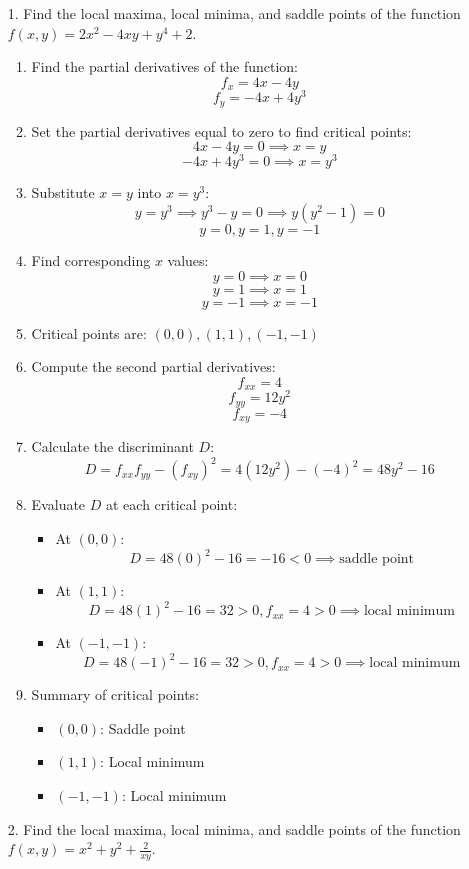 \documentclass[reqno, 12pt]{amsart}
\begin{document}
\newpage
\begin{itemize}
  \item[1.] Find the local maxima, local minima, and saddle points of the function $f(x,y) = 2x^2 -4xy +y^4 +2$.
    \newline

    \begin{answerbox}
      \begin{enumerate}
        \item Find the partial derivatives of the function:
          \[f_x = 4x - 4y\]
          \[f_y = -4x + 4y^3\]
        \item Set the partial derivatives equal to zero to find critical points:
          \[4x - 4y = 0 \implies x = y\]
          \[-4x + 4y^3 = 0 \implies x = y^3\]
        \item Substitute $x = y$ into $x = y^3$:
          \[y = y^3 \implies y^3 - y = 0 \implies y(y^2 - 1) = 0\]
          \[y = 0, y = 1, y = -1\]
        \item Find corresponding $x$ values:
          \[y = 0 \implies x = 0\]
          \[y = 1 \implies x = 1\]
          \[y = -1 \implies x = -1\]
        \item Critical points are: \((0,0), (1,1), (-1,-1)\)
        \item Compute the second partial derivatives:
          \[f_{xx} = 4\]
          \[f_{yy} = 12y^2\]
          \[f_{xy} = -4\]
        \item Calculate the discriminant \(D\):
          \[D = f_{xx}f_{yy} - (f_{xy})^2 = 4(12y^2) - (-4)^2 = 48y^2 - 16\]
        \item Evaluate \(D\) at each critical point:
          \begin{itemize}
            \item At \((0,0)\):
              \[D = 48(0)^2 - 16 = -16 < 0 \implies \text{saddle point}\]
            \item At \((1,1)\):
              \[D = 48(1)^2 - 16 = 32 > 0, f_{xx} = 4 > 0 \implies \text{local minimum}\]
            \item At \((-1,-1)\):
              \[D = 48(-1)^2 - 16 = 32 > 0, f_{xx} = 4 > 0 \implies \text{local minimum}\]
          \end{itemize}
        \item Summary of critical points:
          \begin{itemize}
            \item \((0,0)\): Saddle point
            \item \((1,1)\): Local minimum
            \item \((-1,-1)\): Local minimum
          \end{itemize}
      \end{enumerate}
    \end{answerbox}
    \newpage
  \item[2.] Find the local maxima, local minima, and saddle points of the function $f(x,y) = x^2+y^2+\frac{2}{xy}$.
    \newline


\end{itemize}
\end{document}
